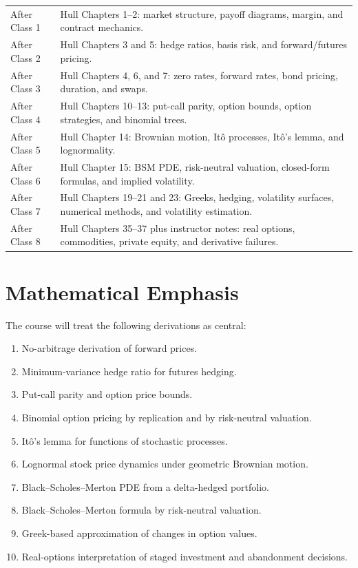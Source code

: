 \documentclass[11pt]{article}
\begin{document}
\begin{tabular}{@{}p{}p{}@{}}
\toprule
After Class 1 & Hull Chapters 1--2: market structure, payoff diagrams, margin, and contract mechanics. \\
After Class 2 & Hull Chapters 3 and 5: hedge ratios, basis risk, and forward/futures pricing. \\
After Class 3 & Hull Chapters 4, 6, and 7: zero rates, forward rates, bond pricing, duration, and swaps. \\
After Class 4 & Hull Chapters 10--13: put-call parity, option bounds, option strategies, and binomial trees. \\
After Class 5 & Hull Chapter 14: Brownian motion, It\^o processes, It\^o's lemma, and lognormality. \\
After Class 6 & Hull Chapter 15: BSM PDE, risk-neutral valuation, closed-form formulas, and implied volatility. \\
After Class 7 & Hull Chapters 19--21 and 23: Greeks, hedging, volatility surfaces, numerical methods, and volatility estimation. \\
After Class 8 & Hull Chapters 35--37 plus instructor notes: real options, commodities, private equity, and derivative failures. \\
\bottomrule
\end{tabular}

\section*{Mathematical Emphasis}

The course will treat the following derivations as central:
\begin{enumerate}
    \item No-arbitrage derivation of forward prices.
    \item Minimum-variance hedge ratio for futures hedging.
    \item Put-call parity and option price bounds.
    \item Binomial option pricing by replication and by risk-neutral valuation.
    \item It\^o's lemma for functions of stochastic processes.
    \item Lognormal stock price dynamics under geometric Brownian motion.
    \item Black--Scholes--Merton PDE from a delta-hedged portfolio.
    \item Black--Scholes--Merton formula by risk-neutral valuation.
    \item Greek-based approximation of changes in option values.
    \item Real-options interpretation of staged investment and abandonment decisions.
\end{enumerate}
\end{document}
